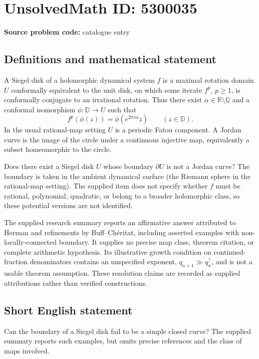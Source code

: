 \documentclass[11pt]{article}
\begin{document}
\section*{UnsolvedMath ID: 5300035}
\textbf{Source problem code:} catalogue entry
\subsection{Definitions and mathematical statement}
A Siegel disk of a holomorphic dynamical system $f$ is a maximal rotation domain $U$ conformally equivalent to the unit disk, on which some iterate $f^p$, $p\geq1$, is conformally conjugate to an irrational rotation. Thus there exist $\alpha\in\mathbb R\setminus\mathbb Q$ and a conformal isomorphism $\phi:\mathbb D\to U$ such that
\[
f^p(\phi(z))=\phi(e^{2\pi i\alpha}z)\qquad(z\in\mathbb D).
\]
In the usual rational-map setting $U$ is a periodic Fatou component. A Jordan curve is the image of the circle under a continuous injective map, equivalently a subset homeomorphic to the circle.

Does there exist a Siegel disk $U$ whose boundary $\partial U$ is not a Jordan curve? The boundary is taken in the ambient dynamical surface (the Riemann sphere in the rational-map setting). The supplied item does not specify whether $f$ must be rational, polynomial, quadratic, or belong to a broader holomorphic class, so these potential versions are not identified.

The supplied research summary reports an affirmative answer attributed to Herman and refinements by Buff--Ch\'eritat, including asserted examples with non-locally-connected boundary. It supplies no precise map class, theorem citation, or complete arithmetic hypothesis. Its illustrative growth condition on continued-fraction denominators contains an unspecified exponent, $q_{n+1}\gg q_n^{?}$, and is not a usable theorem assumption. These resolution claims are recorded as supplied attributions rather than verified constructions.
\subsection{Short English statement}
Can the boundary of a Siegel disk fail to be a simple closed curve? The supplied summary reports such examples, but omits precise references and the class of maps involved.
\end{document}
